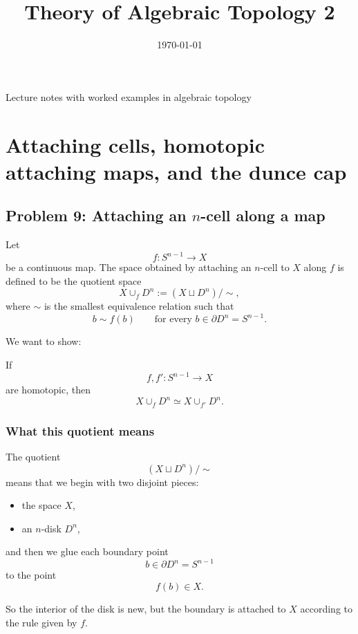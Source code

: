 \documentclass[12pt,a4paper]{article}
\title{\vspace{-1.5em}\bfseries Theory of Algebraic Topology 2}
\author{}
\date{\today}
\theoremstyle{notespace}
\begin{document}
	\maketitle
	\thispagestyle{plain}
		\begin{center}
		\begin{minipage}{0.92\textwidth}
			Lecture notes with worked examples in algebraic topology
		\end{minipage}
	\end{center}
		\tableofcontents
	\clearpage

\section{Attaching cells, homotopic attaching maps, and the dunce cap}

\subsection{Problem 9: Attaching an \(n\)-cell along a map}

Let
\[
f:S^{n-1}\to X
\]
be a continuous map. The space obtained by attaching an \(n\)-cell to \(X\) along \(f\) is defined to be the quotient space
\[
X\cup_f D^n := (X\sqcup D^n)/\sim,
\]
where \(\sim\) is the smallest equivalence relation such that
\[
b\sim f(b)
\qquad
\text{for every } b\in \partial D^n=S^{n-1}.
\]

We want to show:

\medskip

If
\[
f,f':S^{n-1}\to X
\]
are homotopic, then
\[
X\cup_f D^n \simeq X\cup_{f'} D^n.
\]

\subsubsection{What this quotient means}

The quotient
\[
(X\sqcup D^n)/\sim
\]
means that we begin with two disjoint pieces:

\begin{itemize}
	\item the space \(X\),
	\item an \(n\)-disk \(D^n\),
\end{itemize}

and then we glue each boundary point
\[
b\in \partial D^n=S^{n-1}
\]
to the point
\[
f(b)\in X.
\]

So the interior of the disk is new, but the boundary is attached to \(X\) according to the rule given by \(f\).
\end{document}
